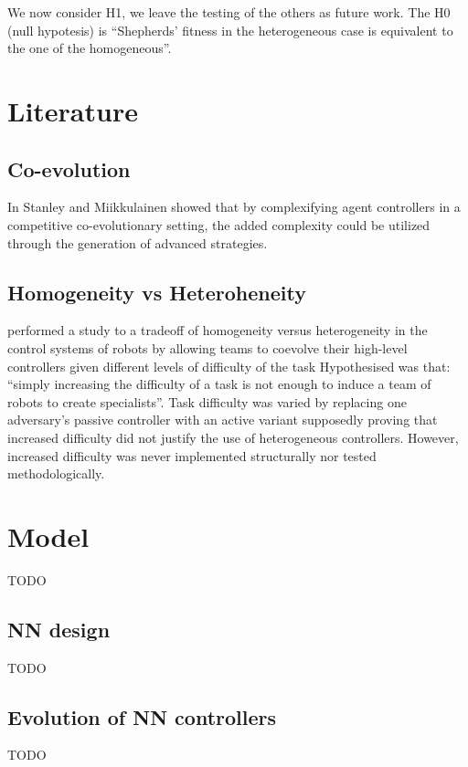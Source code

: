 \documentclass[conference]{IEEEtran}
\begin{document}
We now consider H1, we leave the testing of the others as future work. The H0 (null hypotesis) is “Shepherds’ fitness in the heterogeneous case is equivalent to the one of the homogeneous”.


\section{Literature}
 

\subsection{Co-evolution}
In \cite{stanley2004competitive} Stanley and Miikkulainen showed that by complexifying agent controllers in a competitive co-evolutionary setting, the added complexity could be utilized through the generation of advanced strategies.

\subsection{Homogeneity vs Heteroheneity}

\cite{potter2001heterogeneity} performed a study to a tradeoff of homogeneity versus heterogeneity in the control systems of robots by allowing teams to coevolve their high-level controllers given different levels of difficulty of the task
Hypothesised was that: “simply increasing the difficulty of a task is not enough to induce a team of robots to create specialists”. 
Task difficulty was varied by replacing one adversary's passive controller with an active variant supposedly proving that increased difficulty did not justify the use of heterogeneous controllers.
However, increased difficulty was never implemented structurally nor tested methodologically. 



\section{Model}
TODO

\subsection{NN design}
TODO

\subsection{Evolution of NN controllers}
TODO
\end{document}

